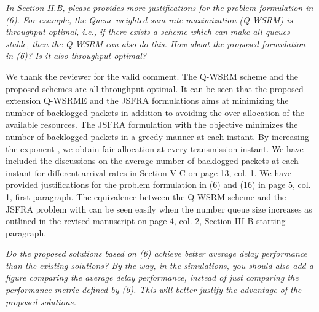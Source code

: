 \begin{itemize}
	
 \textit{In Section II.B, please provides more justifications for the problem formulation in (6). For example, the Queue weighted sum rate maximization (Q-WSRM) is throughput optimal, i.e., if there exists a scheme which can make all queues stable, then the Q-WSRM can also do this. How about the proposed formulation in (6)? Is it also throughput optimal? }

\resp We thank the reviewer for the valid comment. The Q-WSRM scheme and the proposed schemes are all throughput optimal. It can be seen that the proposed extension Q-WSRME and the JSFRA formulations aims at minimizing the number of backlogged packets in addition to avoiding the over allocation of the available resources. The JSFRA formulation with the  objective minimizes the number of backlogged packets in a greedy manner at each instant. By increasing the exponent , we obtain fair allocation at every transmission instant. We have included the discussions on the average number of backlogged packets at each instant for different arrival rates in Section V-C on page 13, col. 1. We have provided justifications for the problem formulation in (6) and (16) in page 5, col. 1, first paragraph. The equivalence between the Q-WSRM scheme and the JSFRA problem with  can be seen easily when the number queue size increases as outlined in the revised manuscript on page 4, col. 2, Section III-B starting paragraph.

 \textit{Do the proposed solutions based on (6) achieve better average delay performance than the existing solutions? By the way, in the simulations, you should also add a figure comparing the average delay performance, instead of just comparing the performance metric defined by (6). This will better justify the advantage of the proposed solutions.}


\end{itemize}
